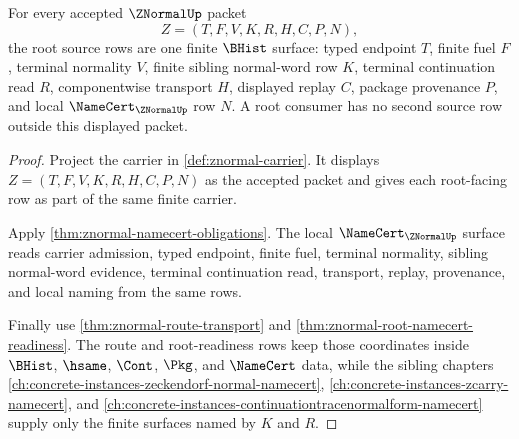 \begin{theorem}
\label{thm:znormal-root-bhist-source}
For every accepted $\ZNormalUp$ packet
$$
Z=(T,F,V,K,R,H,C,P,N),
$$
the root source rows are one finite $\BHist$ surface: typed endpoint $T$, finite fuel $F$, terminal normality $V$, finite sibling normal-word row $K$, terminal continuation read $R$, componentwise transport $H$, displayed replay $C$, package provenance $P$, and local $\NameCert_{\ZNormalUp}$ row $N$. A root consumer has no second source row outside this displayed packet.
\end{theorem}
\begin{proof}
Project the carrier in \autoref{def:znormal-carrier}. It displays $Z=(T,F,V,K,R,H,C,P,N)$ as the accepted packet and gives each root-facing row as part of the same finite carrier.

Apply \autoref{thm:znormal-namecert-obligations}. The local $\NameCert_{\ZNormalUp}$ surface reads carrier admission, typed endpoint, finite fuel, terminal normality, sibling normal-word evidence, terminal continuation read, transport, replay, provenance, and local naming from the same rows.

Finally use \autoref{thm:znormal-route-transport} and \autoref{thm:znormal-root-namecert-readiness}. The route and root-readiness rows keep those coordinates inside $\BHist$, $\hsame$, $\Cont$, $\Pkg$, and $\NameCert$ data, while the sibling chapters \autoref{ch:concrete-instances-zeckendorf-normal-namecert}, \autoref{ch:concrete-instances-zcarry-namecert}, and \autoref{ch:concrete-instances-continuationtracenormalform-namecert} supply only the finite surfaces named by $K$ and $R$.
\end{proof}


